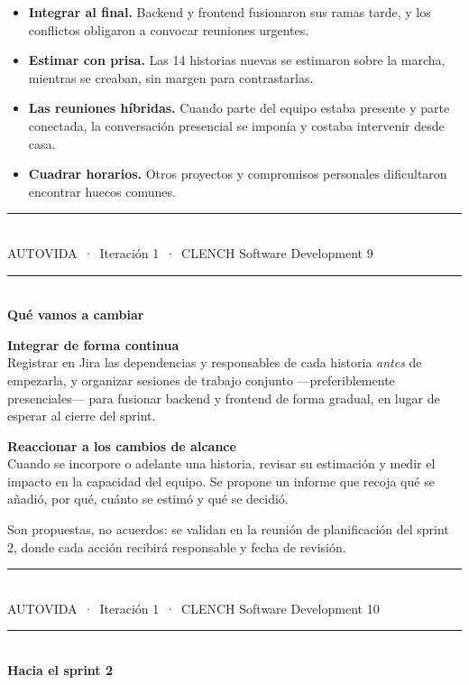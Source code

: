 \documentclass[11pt]{article}
\newcommand{\titulo}[1]{%
  {\color{cian}\rule{2.2cm}{2.2pt}}\\[0.30cm]
  {\fontsize{21}{24}\selectfont\bfseries\color{tinta} #1}\\[0.45cm]}
\newcommand{\tituloclaro}[1]{%
  {\color{cian}\rule{2.2cm}{2.2pt}}\\[0.30cm]
  {\fontsize{21}{24}\selectfont\bfseries\color{white} #1}\\[0.45cm]}
\newcommand{\pie}[1]{%
  \vfill
  {\color{linea}\rule{\textwidth}{0.4pt}}\\[0.12cm]
  {\footnotesize\color{grisclaro} AUTOVIDA\, ·\, Iteración 1\, ·\, CLENCH Software Development
   \hfill #1}}
\begin{document}
\begin{itemize}
  \item \textbf{Integrar al final.} Backend y frontend fusionaron sus ramas tarde, y los conflictos obligaron a convocar reuniones urgentes.
  \item \textbf{Estimar con prisa.} Las 14 historias nuevas se estimaron sobre la marcha, mientras se creaban, sin margen para contrastarlas.
  \item \textbf{Las reuniones híbridas.} Cuando parte del equipo estaba presente y parte conectada, la conversación presencial se imponía y costaba intervenir desde casa.
  \item \textbf{Cuadrar horarios.} Otros proyectos y compromisos personales dificultaron encontrar huecos comunes.
\end{itemize}

\pie{9}
\newpage

\pagecolor{white}
\titulo{Qué vamos a cambiar}
\vfill

\begin{minipage}[t]{0.47\textwidth}
\vspace{0pt}
{\color{magenta}\textbf{Integrar de forma continua}}\\[0.25cm]
{\small Registrar en Jira las dependencias y responsables de cada historia \textit{antes} de empezarla, y organizar sesiones de trabajo conjunto ---preferiblemente presenciales--- para fusionar backend y frontend de forma gradual, en lugar de esperar al cierre del sprint.}
\end{minipage}%
\hfill
\begin{minipage}[t]{0.47\textwidth}
\vspace{0pt}
{\color{magenta}\textbf{Reaccionar a los cambios de alcance}}\\[0.25cm]
{\small Cuando se incorpore o adelante una historia, revisar su estimación y medir el impacto en la capacidad del equipo. Se propone un informe que recoja qué se añadió, por qué, cuánto se estimó y qué se decidió.}
\end{minipage}

\vspace{0.7cm}
{\color{gris} Son propuestas, no acuerdos: se validan en la reunión de planificación del sprint 2, donde cada acción recibirá responsable y fecha de revisión.}

\pie{10}
\newpage

\pagecolor{tinta}
\tituloclaro{Hacia el sprint 2}
\vfill
\end{document}
